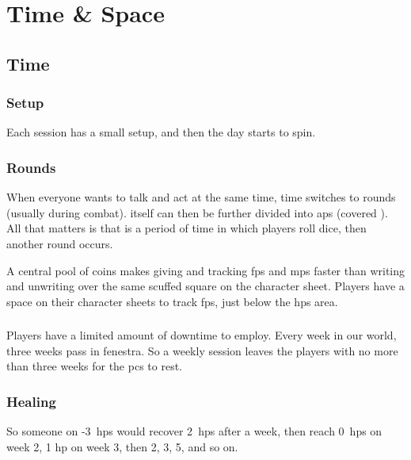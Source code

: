 \pagebreak[0]
\section{Time \& Space}

\begin{multicols}{2}

\subsection{Time}
\label{time}

\subsubsection{Setup}
Each session has a small setup, and then the day starts to spin.



\subsubsection{Rounds}

When everyone wants to talk and act at the same time, time switches to \glspl{round} (usually during combat).
 itself can then be further divided into \glspl{ap} (covered ).
All that matters is that  is a period of time in which players roll dice, then another \gls{round} occurs.



A central pool of coins makes giving and tracking \glspl{fp} and \glspl{mp} faster than writing and unwriting over the same scuffed square on the character sheet.
Players have a space on their character sheets to track \glspl{fp}, just below the \glspl{hp} area.

\subsubsection{}

Players have a limited amount of \gls{downtime} to employ.
Every week in our world, three weeks pass in \gls{fenestra}.
So a weekly session leaves the players with no more than three weeks for the \glspl{pc} to rest.

\subsubsection{Healing}
\label{healing}

So someone on -3~\glspl{hp} would recover 2~\glspl{hp} after a week, then reach 0~\glspl{hp} on week 2, 1 \gls{hp} on week 3, then 2, 3, 5, and so on.


\end{multicols}
